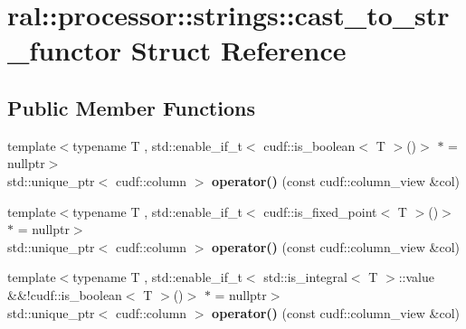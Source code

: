 \hypertarget{structral_1_1processor_1_1strings_1_1cast__to__str__functor}{}\section{ral\+:\+:processor\+:\+:strings\+:\+:cast\+\_\+to\+\_\+str\+\_\+functor Struct Reference}
\label{structral_1_1processor_1_1strings_1_1cast__to__str__functor}
\subsection*{Public Member Functions}
\begin{DoxyCompactItemize}
\item 
\mbox{\label{structral_1_1processor_1_1strings_1_1cast__to__str__functor_ada42b05ccacb321248b8321987eb6f29}} 
{\footnotesize template$<$typename T , std\+::enable\+\_\+if\+\_\+t$<$ cudf\+::is\+\_\+boolean$<$ T $>$()$>$ $\ast$  = nullptr$>$ }\\std\+::unique\+\_\+ptr$<$ cudf\+::column $>$ {\bfseries operator()} (const cudf\+::column\+\_\+view \&col)
\item 
\mbox{\label{structral_1_1processor_1_1strings_1_1cast__to__str__functor_ada42b05ccacb321248b8321987eb6f29}} 
{\footnotesize template$<$typename T , std\+::enable\+\_\+if\+\_\+t$<$ cudf\+::is\+\_\+fixed\+\_\+point$<$ T $>$()$>$ $\ast$  = nullptr$>$ }\\std\+::unique\+\_\+ptr$<$ cudf\+::column $>$ {\bfseries operator()} (const cudf\+::column\+\_\+view \&col)
\item 
\mbox{\label{structral_1_1processor_1_1strings_1_1cast__to__str__functor_ada42b05ccacb321248b8321987eb6f29}} 
{\footnotesize template$<$typename T , std\+::enable\+\_\+if\+\_\+t$<$ std\+::is\+\_\+integral$<$ T $>$\+::value \&\&!cudf\+::is\+\_\+boolean$<$ T $>$()$>$ $\ast$  = nullptr$>$ }\\std\+::unique\+\_\+ptr$<$ cudf\+::column $>$ {\bfseries operator()} (const cudf\+::column\+\_\+view \&col)
\item 
\mbox{\label{structral_1_1processor_1_1strings_1_1cast__to__str__functor_ada42b05ccacb321248b8321987eb6f29}} 

\end{DoxyCompactItemize}
